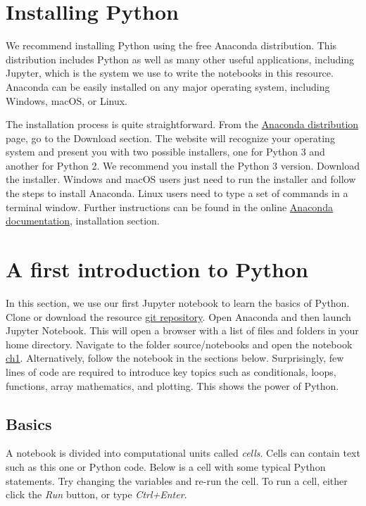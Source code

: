\documentclass[a4paper , 12pt]{book}
\begin{document}
\section{Installing Python}

We recommend installing Python using the free Anaconda distribution. This distribution includes Python as well as many other useful applications, including Jupyter, which is the system we use to write the notebooks in this resource. Anaconda can be easily installed on any major operating system, including Windows, macOS, or Linux.

The installation process is quite straightforward. From the \href {https://www.anaconda.com/distribution/}{Anaconda distribution} page, go to the Download section. The website will recognize your operating system and present you with two possible installers, one for Python 3 and another for Python 2. We recommend you install the Python 3 version. Download the installer. Windows and macOS users just need to run the installer and follow the steps to install Anaconda. Linux users need to type a set of commands in a terminal window. Further instructions can be found in the online \href {https://docs.anaconda.com/anaconda/} {Anaconda documentation}, installation section.

\section{A first introduction to Python}

In this section, we use our first Jupyter notebook to learn the basics of Python. Clone or download the resource \href{https://github.com/nfcd/compGeo}{git repository}. Open Anaconda and then launch Jupyter Notebook. This will open a browser with a list of files and folders in your home directory. Navigate to the folder source/notebooks and open the notebook \href{https://github.com/nfcd/compGeo/blob/master/source/notebooks/ch1.ipynb}{ch1}. Alternatively, follow the notebook in the sections below. Surprisingly, few lines of code are required to introduce key topics such as conditionals, loops, functions, array mathematics, and plotting. This shows the power of Python.

\subsection{Basics}

A notebook is divided into computational units called \textit{cells}. Cells can contain text such as this one or Python code. Below is a cell with some typical Python statements. Try changing the variables and re-run the cell. To run a cell, either click the \textit{Run} button, or type \textit{Ctrl+Enter}.
\end{document}
